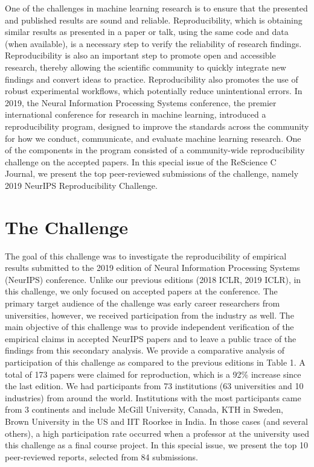 One of the challenges in machine learning research is to ensure that the presented and
published results are sound and reliable. Reproducibility, which is obtaining similar results
as presented in a paper or talk, using the same code and data (when available), is a
necessary step to verify the reliability of research findings. Reproducibility is also an
important step to promote open and accessible research, thereby allowing the scientific
community to quickly integrate new findings and convert ideas to practice.
Reproducibility also promotes the use of robust experimental workflows, which
potentially reduce unintentional errors. In 2019, the Neural Information Processing
Systems conference, the premier international conference for research in machine
learning, introduced a reproducibility program, designed to improve the standards
across the community for how we conduct, communicate, and evaluate machine
learning research. One of the components in the program consisted of a community-wide reproducibility challenge on the accepted papers. In this special issue of the ReScience C Journal, we present the top peer-reviewed submissions of the challenge, namely 2019 NeurIPS Reproducibility Challenge.


\section{The Challenge} 

The goal of this challenge was to investigate the reproducibility of empirical results submitted to the 2019 edition of Neural Information Processing Systems (NeurIPS) conference. Unlike our previous editions (2018 ICLR, 2019 ICLR), in this challenge, we only focused on accepted papers at the conference. The primary target audience of the challenge was early career researchers from universities, however, we received participation from the industry as well. The main objective of this challenge was to provide independent verification of the empirical claims in accepted NeurIPS papers and to leave a public trace of the findings from this secondary analysis. We provide a comparative analysis of participation of this challenge as compared to the previous editions in Table 1. A total of 173 papers were claimed for reproduction, which is a 92\% increase since the last edition. We had participants from 73 institutions (63 universities and 10 industries) from around the world. Institutions with the most participants came from 3 continents and include McGill University, Canada, KTH in Sweden, Brown University in the US and IIT Roorkee in India. In those cases (and several others), a high participation rate occurred when a professor at the university used this challenge as a final course project. In this special issue, we present the top 10 peer-reviewed reports, selected from 84 submissions.

